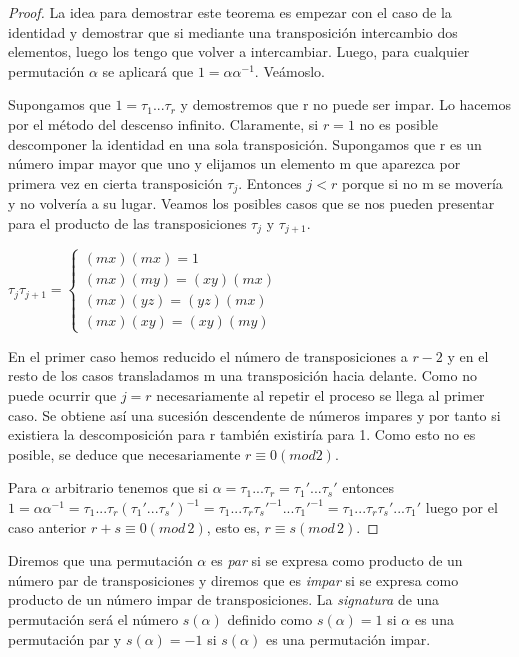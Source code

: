 \begin{proof}
La idea para demostrar este teorema es empezar con el caso de la identidad y demostrar que si mediante una transposición intercambio dos elementos, luego los tengo que volver a intercambiar. Luego, para cualquier permutación $\alpha$ se aplicará que $1 = \alpha\alpha^{-1}$. Veámoslo.

Supongamos que $1 = \tau_1...\tau_r$ y demostremos que r no puede ser impar. Lo hacemos por el método del descenso infinito. Claramente, si $r = 1$ no es posible descomponer la identidad en una sola transposición. Supongamos que r es un número impar mayor que uno y elijamos un elemento m que aparezca por primera vez en cierta transposición $\tau_j$. Entonces $j < r$ porque si no m se movería y no volvería a su lugar. Veamos los posibles casos que se nos pueden presentar para el producto de las transposiciones $\tau_j$ y $\tau_{j+1}$.

$\tau_j\tau_{j+1}=
\begin{cases}
(mx)(mx) = 1 \\
(mx)(my) = (xy)(mx) \\
(mx)(yz) = (yz)(mx) \\
(mx)(xy) = (xy)(my)
\end{cases}$

En el primer caso hemos reducido el número de transposiciones a $r-2$ y en el resto de los casos transladamos m una transposición hacia delante. Como no puede ocurrir que $j = r$ necesariamente al repetir el proceso se llega al primer caso. Se obtiene así una sucesión descendente de números impares y por tanto si existiera la descomposición para r también existiría para 1. Como esto no es posible, se deduce que necesariamente $r \equiv 0 (mod 2)$.

Para $\alpha$ arbitrario tenemos que si $\alpha = \tau_1...\tau_r = \tau_1'...\tau_s'$ entonces $1 = \alpha\alpha^{-1} = \tau_1...\tau_r(\tau_1'...\tau_s')^{-1} = \tau_1...\tau_r\tau_s'^{-1}...\tau_1'^{-1} = \tau_1...\tau_r\tau_s'...\tau_1'$ luego por el caso anterior $r+s \equiv 0 (mod \, 2)$, esto es, $r \equiv s (mod \, 2)$.
\end{proof}

\begin{ndef}
Diremos que una permutación $\alpha$ es \textit{par} si se expresa como producto de un número par de transposiciones y diremos que es \textit{impar} si se expresa como producto de un número impar de transposiciones. La \textit{signatura} de una permutación será el número $s(\alpha)$ definido como $s(\alpha) = 1$ si $\alpha$ es una permutación par y $s(\alpha) = -1$ si $s(\alpha)$ es una permutación impar.
\end{ndef}

